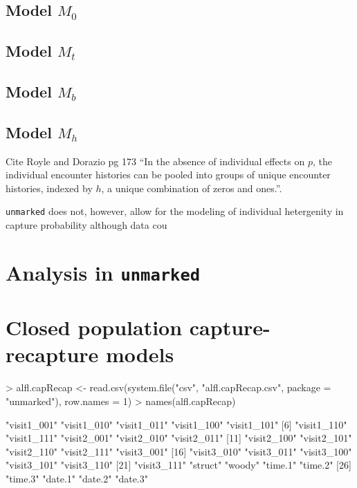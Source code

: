 \documentclass[a4paper]{article}
\renewenvironment{Schunk}{\vspace{\topsep}}{\vspace{\topsep}}
\begin{document}
\subsection{Model $M_0$}



\subsection{Model $M_t$}





\subsection{Model $M_b$}




\subsection{Model $M_h$}

Cite Royle and Dorazio pg 173 ``In the absence of individual effects
on $p$, the individual encounter histories can be pooled into groups
of unique encounter histories, indexed by $h$, a unique combination of
zeros and ones.''.

{\tt unmarked} does not, however, allow for the modeling of individual
  hetergenity in capture probability although data cou


\section{Analysis in {\tt unmarked}}




\section{Closed population capture-recapture models}




\begin{Schunk}
\begin{Sinput}
> alfl.capRecap <- read.csv(system.file("csv", "alfl.capRecap.csv", 
     package = "unmarked"), row.names = 1)
> names(alfl.capRecap)
\end{Sinput}
\begin{Soutput}
 [1] "visit1_001" "visit1_010" "visit1_011" "visit1_100" "visit1_101"
 [6] "visit1_110" "visit1_111" "visit2_001" "visit2_010" "visit2_011"
[11] "visit2_100" "visit2_101" "visit2_110" "visit2_111" "visit3_001"
[16] "visit3_010" "visit3_011" "visit3_100" "visit3_101" "visit3_110"
[21] "visit3_111" "struct"     "woody"      "time.1"     "time.2"    
[26] "time.3"     "date.1"     "date.2"     "date.3"    
\end{Soutput}
\end{Schunk}
\end{document}
